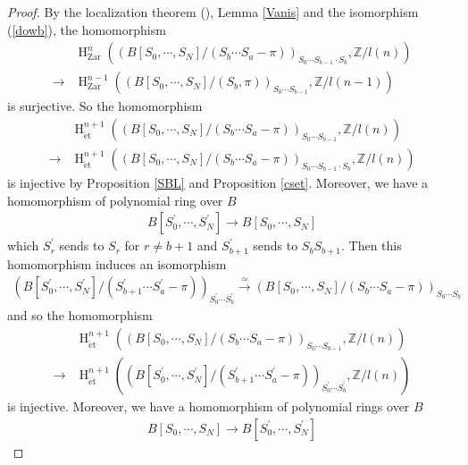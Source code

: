 \documentclass{article}
\newcommand{\et}{\mathrm{\acute{e}t}}
\newcommand{\Zar}{\mathrm{Zar}}
\newcommand{\HO}{\operatorname{H}}
\begin{document}
%
\begin{proof}\upshape
By the localization theorem (\cite[p.779, Theorem 3.2]{Ge}), Lemma \ref{Vanis} and the isomorphism (\ref{dowb}), the homomorphism 
%
\begin{align*}
&\HO^{n}_{\Zar}\left(
(B[S_{0}, \cdots, S_{N}]/(S_{b}\cdots S_{a}-\pi))_{S_{0}\cdots S_{b-1}\cdot S_{b}},
\mathbb{Z}/l(n)
\right)
\\
\to
&
\HO^{n-1}_{\Zar}\left(
(B[S_{0}, \cdots, S_{N}]/(S_{b}, \pi))_{S_{0}\cdots S_{b-1}},
\mathbb{Z}/l(n-1)
\right)
\end{align*}
%
is surjective. So the homomorphism
%
\begin{align*}
&\HO^{n+1}_{\et}\left(
(B[S_{0}, \cdots, S_{N}]/(S_{b}\cdots S_{a}-\pi))_{S_{0}\cdots S_{b-1}},
\mathbb{Z}/l(n)
\right)  
\\
\to
&\HO^{n+1}_{\et}\left(
(
B[S_{0}, \cdots, S_{N}]/(S_{b}\cdots S_{a}-\pi))_{S_{0}\cdots S_{b-1}\cdot S_{b}},
\mathbb{Z}/l(n)
\right)
\end{align*}
%
is injective by Proposition \ref{SBL} and Proposition \ref{cset}. 
Moreover, we have a homomorphism of polynomial ring over $B$
%
\begin{align*}
B[S^{\prime}_{0}, \cdots, S^{\prime}_{N}] 
\to
B[S_{0}, \cdots, S_{N}]
\end{align*}
%
which $S_{r}^{\prime}$ sends to $S_{r}$ for $r\neq b+1$ and
$S_{b+1}^{\prime}$ sends to $S_{b}S_{b+1}$. Then this homomorphism induces an isomorphism
%
\begin{align*}
\left(
B[S^{\prime}_{0}, \cdots, S^{\prime}_{N}]/
(S^{\prime}_{b+1}\cdots S^{\prime}_{a}-\pi)
\right)_{S^{\prime}_{0}\cdots S^{\prime}_{b}}
\xrightarrow{\simeq}
\left(
B[S_{0}, \cdots, S_{N}]/
(S_{b}\cdots S_{a}-\pi)
\right)_{S_{0}\cdots S_{b}}
\end{align*}
%
and so the homomorphism
%
\begin{align*}
&\HO^{n+1}_{\et}\left(
\left(B[S_{0}, \cdots, S_{N}]/(S_{b}\cdots S_{a}-\pi)\right)_{S_{0}\cdots S_{b-1}},
\mathbb{Z}/l(n)
\right)  \\
\to
&
\HO^{n+1}_{\et}\left(
\left(
B[S^{\prime}_{0}, \cdots, S^{\prime}_{N}]/
(S^{\prime}_{b+1}\cdots S^{\prime}_{a}-\pi)
\right)_{S^{\prime}_{0}\cdots S^{\prime}_{b}},
\mathbb{Z}/l(n)
\right)
\end{align*}
%
is injective. Moreover, we have a homomorphism
of polynomial rings over $B$
%
\begin{align*}
B[S_{0}, \cdots, S_{N}]
\to
B[S^{\prime}_{0}, \cdots, S^{\prime}_{N}]
\end{align*}

\end{proof}
\end{document}
